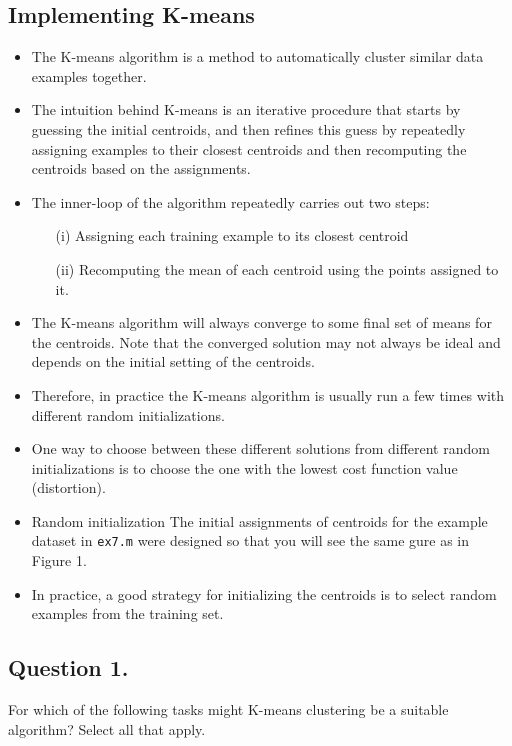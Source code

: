 \documentclass[11pt]{article} %
\begin{document}
\subsection{Implementing K-means}
\begin{itemize}
	\item The K-means algorithm is a method to automatically cluster similar data examples together.
	
	\item The intuition behind K-means is an iterative procedure that starts by guessing the initial centroids, and then refines this guess by repeatedly assigning examples to their closest centroids and then recomputing the centroids based on the assignments.
	
	\item The inner-loop of the algorithm repeatedly carries out two steps: 
	\begin{itemize}
		\item[(i)] Assigning each training example to its closest centroid 
		\item[(ii)] Recomputing the mean of each centroid using the points assigned to it. 
	\end{itemize}
	
	
	\item The K-means algorithm will always converge to some final set of means for the centroids.
	Note that the converged solution may not always be ideal and depends on the initial setting of the centroids. 
	
	\item Therefore, in practice the K-means algorithm is usually run a few times with different random initializations. 
	
	\item One way to choose between these different solutions from different random initializations is to choose the one with the lowest cost function value (distortion).
	
	\item Random initialization
	The initial assignments of centroids for the example dataset in \texttt{ex7.m} were designed so that you will see the same gure as in Figure 1. 
	
	\item In practice, a good strategy for initializing the centroids is to select random examples from the training set.
\end{itemize}
\subsection*{Question 1. }
For which of the following tasks might K-means clustering be a suitable algorithm? Select all that apply.
\end{document}
